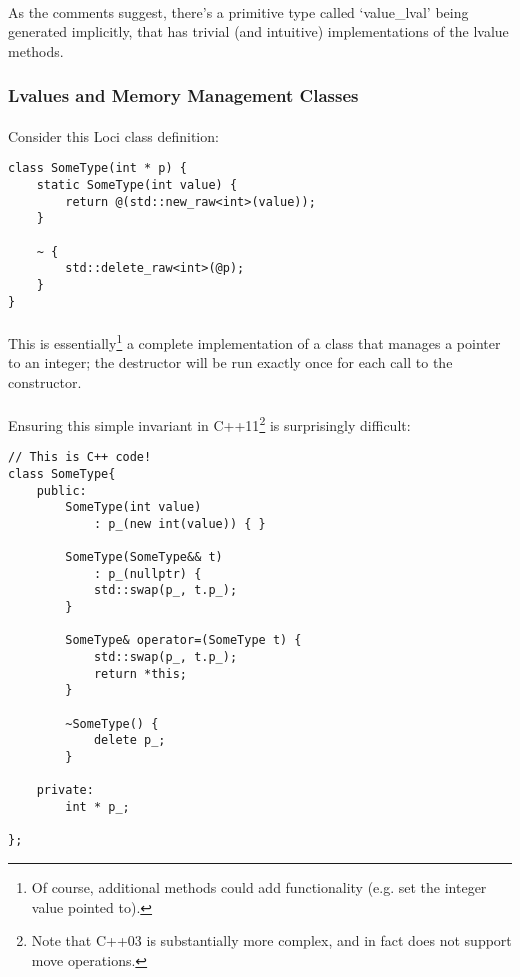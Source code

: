 \documentclass[12pt,twoside,notitlepage]{report}
\begin{document}
\paragraph{}
As the comments suggest, there’s a primitive type called `value\_lval' being generated implicitly, that has trivial (and intuitive) implementations of the lvalue methods.

\subsubsection{Lvalues and Memory Management Classes}

\paragraph{}
Consider this Loci class definition:

\begin{lstlisting}
class SomeType(int * p) {
	static SomeType(int value) {
		return @(std::new_raw<int>(value));
	}
	
	~ {
		std::delete_raw<int>(@p);
	}
}
\end{lstlisting}

\paragraph{}
This is essentially\footnote{Of course, additional methods could add functionality (e.g. set the integer value pointed to).} a complete implementation of a class that manages a pointer to an integer; the destructor will be run exactly once for each call to the constructor.

\paragraph{}
Ensuring this simple invariant in C++11\footnote{Note that C++03 is substantially more complex, and in fact does not support move operations.} is surprisingly difficult:

\begin{lstlisting}
// This is C++ code!
class SomeType{
	public:
		SomeType(int value)
			: p_(new int(value)) { }
		
		SomeType(SomeType&& t) 
			: p_(nullptr) {
			std::swap(p_, t.p_);
		}
		
		SomeType& operator=(SomeType t) {
			std::swap(p_, t.p_);
			return *this;
		}
		
		~SomeType() {
			delete p_;
		}
	
	private:
		int * p_;
	
};
\end{lstlisting}
\end{document}
